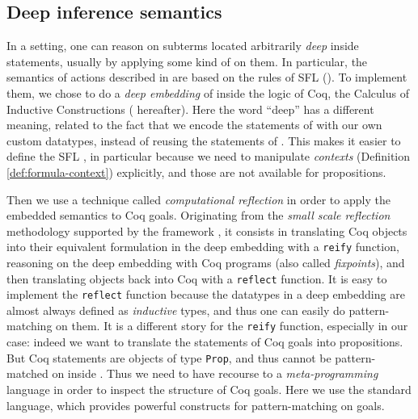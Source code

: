 \subsection{Deep inference semantics}

In a  setting, one can reason on subterms located arbitrarily
\emph{deep} inside statements, usually by applying some kind of 
on them. In particular, the semantics of  actions described in 
are based on the rules of SFL (). To implement them, we chose to do
a \emph{deep embedding} of  inside the logic of Coq, the
Calculus of Inductive Constructions ( hereafter). Here the word
``deep'' has a different meaning, related to the fact that we encode the
statements of  with our own custom datatypes, instead of
reusing the statements of . This makes it easier to define the SFL
, in particular because we need to manipulate \emph{contexts}
(Definition \ref{def:formula-context}) explicitly, and those are not available
for  propositions.

Then we use a technique called \emph{computational reflection} in order to apply
the embedded  semantics to Coq goals. Originating from the
\emph{small scale reflection} methodology supported by the {\ssreflect}
framework \cite{SSR}, it consists in translating Coq objects into their
equivalent formulation in the deep embedding with a \texttt{reify} function,
reasoning on the deep embedding with Coq programs (also called
\emph{fixpoints}), and then translating objects back into Coq with a
\texttt{reflect} function. It is easy to implement the \texttt{reflect} function
because the datatypes in a deep embedding are almost always defined as
\emph{inductive} types, and thus one can easily do pattern-matching on them. It
is a different story for the \texttt{reify} function, especially in our case:
indeed we want to translate the statements of Coq goals into 
propositions. But Coq statements are objects of type \texttt{Prop}, and thus
cannot be pattern-matched on inside .
Thus we need to have recourse to a \emph{meta-programming} language in order to
inspect the structure of Coq goals. Here we use the standard {\ltac} language,
which provides powerful constructs for pattern-matching on goals.

